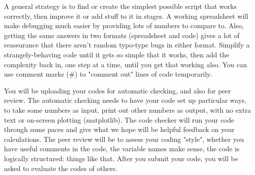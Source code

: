 A general strategy is to find or create the simplest possible script that works correctly, then improve it or add stuff to it in stages. A working spreadsheet will make debugging much easier by providing lots of numbers to compare to. Also, getting the same answers in two formats (spreadsheet and code) gives a lot of reassurance that there aren't random typo-type bugs in either format. Simplify a strangely-behaving code until it gets so simple that it works, then add the complexity back in, one step at a time, until you get that working also. You can use comment marks (#) to "comment out" lines of code temporarily.

You will be uploading your codes for automatic checking, and also for peer review. The automatic checking needs to have your code set up particular ways, to take some numbers as input, print out other numbers as output, with no extra text or on-screen plotting (matplotlib). The code checker will run your code through some paces and give what we hope will be helpful feedback on your calculations. The peer review will be to assess your coding "style", whether you have useful comments in the code, the variable names make sense, the code is logically structured: things like that. After you submit your code, you will be asked to evaluate the codes of others.

